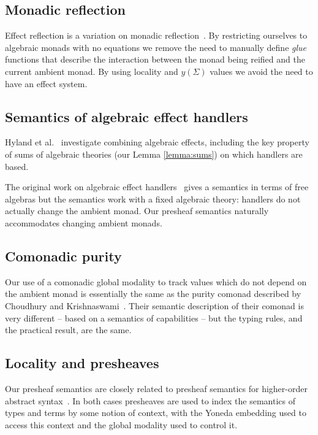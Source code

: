 \documentclass[acmsmall, screen, review, anonymous]{acmart}
\theoremstyle{definition}
\newcommand{\yoneda}[1]{y(#1)}
\begin{document}
\subsection{Monadic reflection}

Effect reflection is a variation on monadic
reflection~\cite{filinski1999representing}. By restricting ourselves to
algebraic monads with no equations we remove the need to manually define
\emph{glue} functions that describe the interaction between the monad
being reified and the current ambient monad. By using locality and
$\yoneda{\Sigma}$ values we avoid the need to have an effect system.

\subsection{Semantics of algebraic effect handlers}

Hyland et al.~\cite{hyland2006combining} investigate combining algebraic
effects, including the key property of sums of algebraic theories (our
Lemma \ref{lemma:sums}) on which handlers are based.

The original work on algebraic effect
handlers~\cite{plotkin2009handlers,plotkin2013handling} gives a semantics
in terms of free algebras but the semantics work with a fixed algebraic
theory: handlers do not actually change the ambient monad. Our presheaf
semantics naturally accommodates changing ambient monads.

\subsection{Comonadic purity}

Our use of a comonadic global modality to track values which do not
depend on the ambient monad is essentially the same as the purity
comonad described by Choudhury and
Krishnaswami~\cite{choudhury2020recovering}. Their semantic description
of their comonad is very different -- based on a semantics of
capabilities -- but the typing rules, and the practical result, are the
same.

\subsection{Locality and presheaves}

Our presheaf semantics are closely related to presheaf semantics for
higher-order abstract syntax~\cite{hu2022category}. In both cases
presheaves are used to index the semantics of types and terms by some
notion of context, with the Yoneda embedding used to access this context
and the global modality used to control it.

\pagebreak


\end{document}
